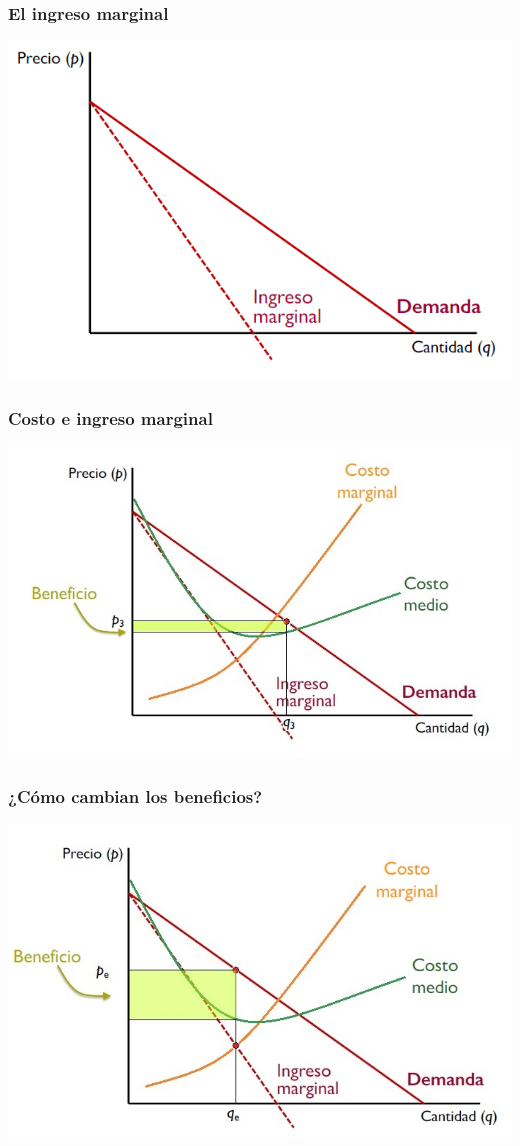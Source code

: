 \documentclass{beamer}
\begin{document}
\begin{frame}
\frametitle{El ingreso marginal}
\includegraphics[scale=0.6]{../Figures/Tema_06.33_ingresomarginal.png}
\end{frame}

\begin{frame}
\frametitle{Costo e ingreso marginal}
\includegraphics[scale=0.6]{../Figures/Tema_06.36_beneficios3.jpg}
\end{frame}

\begin{frame}
\frametitle{¿Cómo cambian los beneficios?}
\includegraphics[scale=0.6]{../Figures/Tema_06.35_beneficios2.jpg}
\end{frame}
\end{document}
